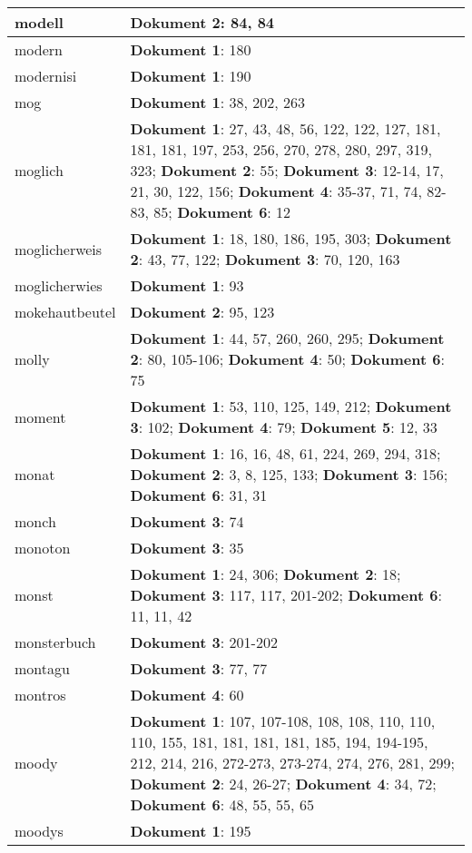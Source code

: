 \documentclass[a5paper]{article}
\begin{document}
\begin{longtable}[l]{|l|p{3in}|}
\hline
modell & \textbf{Dokument 2}: 84, 84 \\
\hline
modern & \textbf{Dokument 1}: 180 \\
\hline
modernisi & \textbf{Dokument 1}: 190 \\
\hline
mog & \textbf{Dokument 1}: 38, 202, 263 \\
\hline
moglich & \textbf{Dokument 1}: 27, 43, 48, 56, 122, 122, 127, 181, 181, 181, 197, 253, 256, 270, 278, 280, 297, 319, 323; \textbf{Dokument 2}: 55; \textbf{Dokument 3}: 12-14, 17, 21, 30, 122, 156; \textbf{Dokument 4}: 35-37, 71, 74, 82-83, 85; \textbf{Dokument 6}: 12 \\
\hline
moglicherweis & \textbf{Dokument 1}: 18, 180, 186, 195, 303; \textbf{Dokument 2}: 43, 77, 122; \textbf{Dokument 3}: 70, 120, 163 \\
\hline
moglicherwies & \textbf{Dokument 1}: 93 \\
\hline
mokehautbeutel & \textbf{Dokument 2}: 95, 123 \\
\hline
molly & \textbf{Dokument 1}: 44, 57, 260, 260, 295; \textbf{Dokument 2}: 80, 105-106; \textbf{Dokument 4}: 50; \textbf{Dokument 6}: 75 \\
\hline
moment & \textbf{Dokument 1}: 53, 110, 125, 149, 212; \textbf{Dokument 3}: 102; \textbf{Dokument 4}: 79; \textbf{Dokument 5}: 12, 33 \\
\hline
monat & \textbf{Dokument 1}: 16, 16, 48, 61, 224, 269, 294, 318; \textbf{Dokument 2}: 3, 8, 125, 133; \textbf{Dokument 3}: 156; \textbf{Dokument 6}: 31, 31 \\
\hline
monch & \textbf{Dokument 3}: 74 \\
\hline
monoton & \textbf{Dokument 3}: 35 \\
\hline
monst & \textbf{Dokument 1}: 24, 306; \textbf{Dokument 2}: 18; \textbf{Dokument 3}: 117, 117, 201-202; \textbf{Dokument 6}: 11, 11, 42 \\
\hline
monsterbuch & \textbf{Dokument 3}: 201-202 \\
\hline
montagu & \textbf{Dokument 3}: 77, 77 \\
\hline
montros & \textbf{Dokument 4}: 60 \\
\hline
moody & \textbf{Dokument 1}: 107, 107-108, 108, 108, 110, 110, 110, 155, 181, 181, 181, 181, 185, 194, 194-195, 212, 214, 216, 272-273, 273-274, 274, 276, 281, 299; \textbf{Dokument 2}: 24, 26-27; \textbf{Dokument 4}: 34, 72; \textbf{Dokument 6}: 48, 55, 55, 65 \\
\hline
moodys & \textbf{Dokument 1}: 195 \\

\end{longtable}
\end{document}
